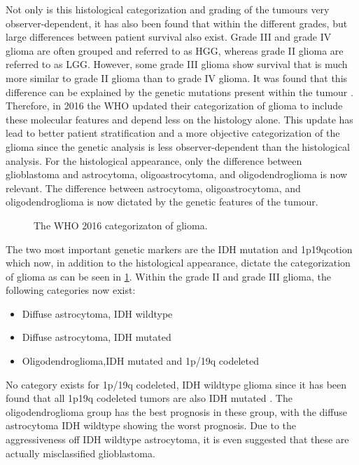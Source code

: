 Not only is this histological categorization and grading of the tumours very observer-dependent, it has also been found that within the different grades, but large differences between patient survival also exist. Grade III and grade IV glioma are often grouped and referred to as \gls{HGG}, whereas grade II glioma are referred to as \gls{LGG}. However, some grade III glioma show survival that is much more similar to grade II glioma than to grade IV glioma. It was found that this difference can be explained by the genetic mutations present within the tumour \autocite{eckel2015gliomagroups}.
Therefore, in 2016 the \gls{WHO} updated their categorization of glioma to include these molecular features \cite{louis20162016} and depend less on the histology alone.
This update has lead to better patient stratification and a more objective categorization of the glioma since the genetic analysis is less observer-dependent than the histological analysis. For the histological appearance, only the difference between glioblastoma and astrocytoma, oligoastrocytoma, and oligodendroglioma is now relevant. The difference between astrocytoma, oligoastrocytoma, and oligodendroglioma is now dictated by the genetic features of the tumour.

\begin{figure}[hbt]
    \centering
    \caption{The WHO 2016 categorizaton of glioma.}\label{fig:intro_glioma_categorization}
\end{figure}


The two most important genetic markers are the \gls{IDH} mutation and \acl{1p19qcotion} which now, in addition to the histological appearance, dictate the categorization of glioma as can be seen in \cref{fig:intro_glioma_categorization}.  Within the grade II and grade III glioma, the following categories now exist:

\begin{itemize}
    \item Diffuse astrocytoma, \gls{IDH} wildtype
    \item Diffuse astrocytoma, \gls{IDH} mutated
    \item Oligodendroglioma,\gls{IDH} mutated and 1p/19q codeleted
\end{itemize}

No category exists for 1p/19q codeleted, \gls{IDH} wildtype glioma since it has been found that all 1p19q codeleted tumors are also IDH mutated \autocite{labussi20101p19qcodeletedIDH}. The oligodendroglioma group has the best prognosis in these group, with the diffuse astrocytoma IDH wildtype showing the worst prognosis. Due to the aggressiveness off IDH wildtype astrocytoma, it is even suggested that these are actually misclassified glioblastoma.

